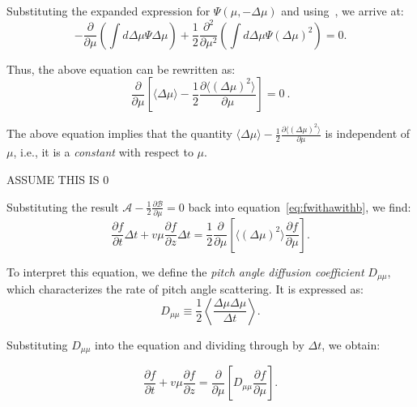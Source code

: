 Substituting the expanded expression for \( \Psi(\mu, -\Delta \mu) \) and using~, we arrive at:
\begin{equation}
-\frac{\partial}{\partial \mu} \left( \int d\Delta \mu \Psi \Delta \mu \right) + \frac{1}{2} \frac{\partial^2}{\partial \mu^2} \left( \int d\Delta \mu \Psi (\Delta \mu)^2 \right) = 0.
\end{equation}

Thus, the above equation can be rewritten as:
\begin{equation}
\frac{\partial}{\partial \mu} \left[ \langle \Delta \mu \rangle - \frac{1}{2} \frac{\partial \langle (\Delta \mu)^2 \rangle}{\partial \mu} \right] = 0~.
\end{equation}

The above equation implies that the quantity \( \langle \Delta \mu \rangle - \frac{1}{2} \frac{\partial  \langle (\Delta \mu)^2 \rangle}{\partial \mu} \) is independent of \( \mu \), i.e., it is a \emph{constant} with respect to \( \mu \). 

{\color{red}ASSUME THIS IS 0}

Substituting the result \( \mathcal{A} - \frac{1}{2} \frac{\partial \mathcal{B}}{\partial \mu} = 0 \) back into equation~\eqref{eq:fwithawithb}, we find:
\begin{equation}
\frac{\partial f}{\partial t} \Delta t  +  v \mu \frac{\partial f}{\partial z} \Delta t = 
\frac{1}{2} \frac{\partial}{\partial \mu} \left[ \langle (\Delta \mu)^2 \rangle \frac{\partial f}{\partial \mu} \right].
\end{equation}

To interpret this equation, we define the \emph{pitch angle diffusion coefficient} \( D_{\mu\mu} \), which characterizes the rate of pitch angle scattering. It is expressed as:
\begin{equation}
D_{\mu\mu} \equiv \frac{1}{2} \left\langle \frac{\Delta \mu \Delta \mu}{\Delta t} \right\rangle.
\end{equation}

Substituting \( D_{\mu\mu} \) into the equation and dividing through by \( \Delta t \), we obtain:
\begin{remark}
\begin{equation}
\frac{\partial f}{\partial t} + v \mu \frac{\partial f}{\partial z} = \frac{\partial}{\partial \mu} \left[ D_{\mu\mu} \frac{\partial f}{\partial \mu} \right].
\end{equation}
\end{remark}

